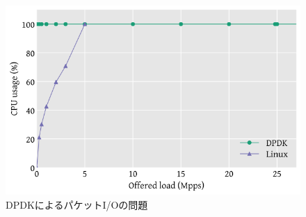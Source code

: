 \begin{figure}[htb]
  \centering
  \includegraphics[width=\columnwidth]{pictures/DPDKProblem.png}
  \caption{DPDKによるパケットI/Oの問題}
  \label{fig:DPDKProblem}
\end{figure}
